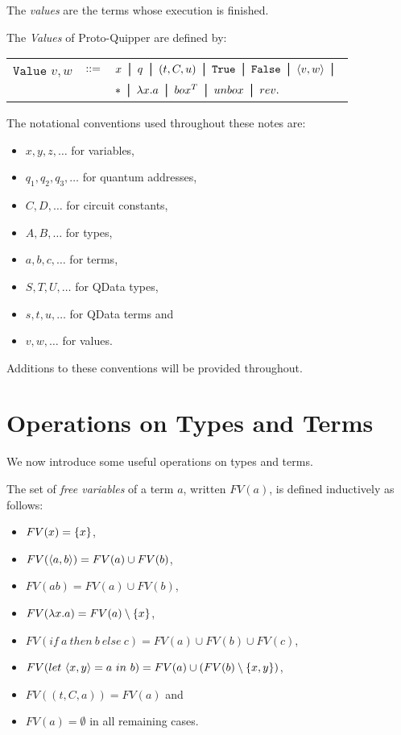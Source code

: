 \documentclass{article}
\begin{document}
The \emph{values} are the terms whose execution is finished.

\begin{definition}
The \emph{Values} of Proto-Quipper are defined by:
\begin{center}
\begin{tabular}{rcl}
$\mathtt{Value}$ $v,w$ & $::=$ & $x \bor q \bor (t,C,u) \bor \true \bor \false 
\bor \atuple{v,w} \bor$ \\
& & $* \bor \lambda x.a  \bor box^T \bor unbox \bor rev.$
\end{tabular}
\end{center}
\end{definition}

The notational conventions used throughout these notes are:
\begin{itemize}
  \item $x,y,z,\ldots$ for variables,
  \item $q_1,q_2,q_3,\ldots$ for quantum addresses,
  \item $C,D,\ldots$ for circuit constants,
  \item $A,B,\ldots$ for types,
  \item $a,b,c,\ldots$ for terms,
  \item $S,T,U,\ldots$ for QData types,
  \item $s,t,u,\ldots$ for QData terms and
  \item $v,w,\ldots$ for values.
\end{itemize}
Additions to these conventions will be provided throughout.


\section{Operations on Types and Terms}

We now introduce some useful operations on types and terms. 

\begin{definition}
The set of \emph{free variables} of a term $a$, written $FV(a)$, 
is defined inductively as follows:
\begin{itemize}
  \item $FV(x)=\{x\}$,
  \item $FV(\langle a,b\rangle)=FV(a)\cup FV(b)$,
  \item $FV(ab)=FV(a)\cup FV(b)$,
  \item $FV(\lambda x.a)=FV(a)\setminus\{x\}$,
  \item $FV(if ~a~ then ~b~ else ~c) = FV(a) \cup FV(b) \cup FV(c)$,
  \item $FV(let ~\langle x,y\rangle=a ~in~ b)= FV(a)\cup (FV(b)\setminus \{x,y\})$,
  \item $FV((t,C,a))= FV(a)$ and
  \item $FV(a)=\emptyset$ in all remaining cases.
\end{itemize}
\end{definition}
\end{document}

